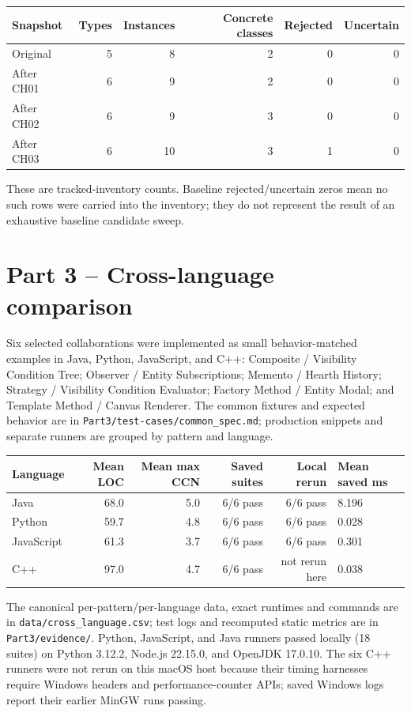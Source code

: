 \documentclass[11pt,a4paper]{article}
\newcommand{\code}[1]{\texttt{\small #1}}
\begin{document}
\begin{center}
\begin{tabular}{lrrrrr}
\toprule
Snapshot & Types & Instances & Concrete classes & Rejected & Uncertain \\
\midrule
Original & 5 & 8 & 2 & 0 & 0 \\
After CH01 & 6 & 9 & 2 & 0 & 0 \\
After CH02 & 6 & 9 & 3 & 0 & 0 \\
After CH03 & 6 & 10 & 3 & 1 & 0 \\
\bottomrule
\end{tabular}
\end{center}
These are tracked-inventory counts. Baseline rejected/uncertain zeros mean no
such rows were carried into the inventory; they do not represent the result
of an exhaustive baseline candidate sweep.

\section{Part 3 -- Cross-language comparison}
Six selected collaborations were implemented as small behavior-matched
examples in Java, Python, JavaScript, and C++: Composite / Visibility Condition
Tree; Observer / Entity Subscriptions; Memento / Hearth History; Strategy /
Visibility Condition Evaluator; Factory Method / Entity Modal; and Template
Method / Canvas Renderer. The common fixtures and expected behavior are in
\code{Part3/test-cases/common\_spec.md}; production snippets and separate
runners are grouped by pattern and language.

\begin{center}
\begin{tabular}{lrrrrl}
\toprule
Language & Mean LOC & Mean max CCN & Saved suites & Local rerun & Mean saved ms \\
\midrule
Java & 68.0 & 5.0 & 6/6 pass & 6/6 pass & 8.196 \\
Python & 59.7 & 4.8 & 6/6 pass & 6/6 pass & 0.028 \\
JavaScript & 61.3 & 3.7 & 6/6 pass & 6/6 pass & 0.301 \\
C++ & 97.0 & 4.7 & 6/6 pass & not rerun here & 0.038 \\
\bottomrule
\end{tabular}
\end{center}

The canonical per-pattern/per-language data, exact runtimes and commands are
in \code{data/cross\_language.csv}; test logs and recomputed static metrics
are in \code{Part3/evidence/}. Python, JavaScript, and Java runners passed
locally (18 suites) on Python 3.12.2, Node.js 22.15.0, and OpenJDK 17.0.10.
The six C++ runners were not rerun on this macOS host because their timing
harnesses require Windows headers and performance-counter APIs; saved Windows
logs report their earlier MinGW runs passing.
\end{document}
